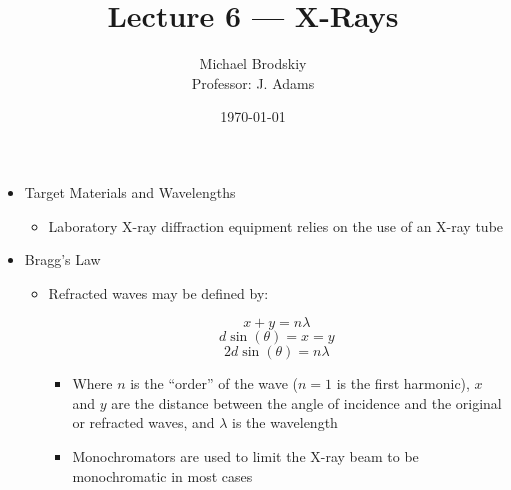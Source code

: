 


\title{Lecture 6 — X-Rays}
\date{\today}
\author{Michael Brodskiy\\ \small Professor: J. Adams}



\maketitle

\begin{itemize}

  \item Target Materials and Wavelengths

    \begin{itemize}

      \item Laboratory X-ray diffraction equipment relies on the use of an X-ray tube

    \end{itemize}

  \item Bragg's Law

    \begin{itemize}

      \item Refracted waves may be defined by:

        $$x+y=n\lambda$$
        $$d\sin(\theta)=x=y$$
        $$2d\sin(\theta)=n\lambda$$

        \begin{itemize}

          \item Where $n$ is the ``order'' of the wave ($n=1$ is the first harmonic), $x$ and $y$ are the distance between the angle of incidence and the original or refracted waves, and $\lambda$ is the wavelength

          \item Monochromators are used to limit the X-ray beam to be monochromatic in most cases

        \end{itemize}

    \end{itemize}

\end{itemize}



